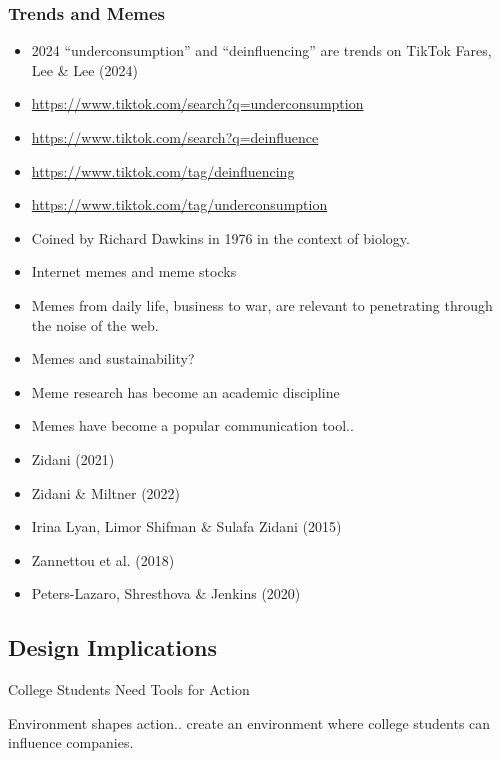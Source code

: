 \documentclass[
  letterpaper,
  DIV=11,
  numbers=noendperiod]{scrartcl}
\begin{document}
\subsubsection{Trends and Memes}\label{trends-and-memes}

\begin{itemize}
\item
  2024 ``underconsumption'' and ``deinfluencing'' are trends on TikTok
  Fares, Lee \& Lee (2024)
\item
  \url{https://www.tiktok.com/search?q=underconsumption}
\item
  \url{https://www.tiktok.com/search?q=deinfluence}
\item
  \url{https://www.tiktok.com/tag/deinfluencing}
\item
  \url{https://www.tiktok.com/tag/underconsumption}
\item
  Coined by Richard Dawkins in 1976 in the context of biology.
\item
  Internet memes and meme stocks
\item
  Memes from daily life, business to war, are relevant to penetrating
  through the noise of the web.
\item
  Memes and sustainability?
\item
  Meme research has become an academic discipline
\item
  Memes have become a popular communication tool..
\item
  Zidani (2021)
\item
  Zidani \& Miltner (2022)
\item
  Irina Lyan, Limor Shifman \& Sulafa Zidani (2015)
\item
  Zannettou et al. (2018)
\item
  Peters-Lazaro, Shresthova \& Jenkins (2020)
\end{itemize}

\subsection{Design Implications}\label{design-implications}

College Students Need Tools for Action

Environment shapes action.. create an environment where college students
can influence companies.
\end{document}
